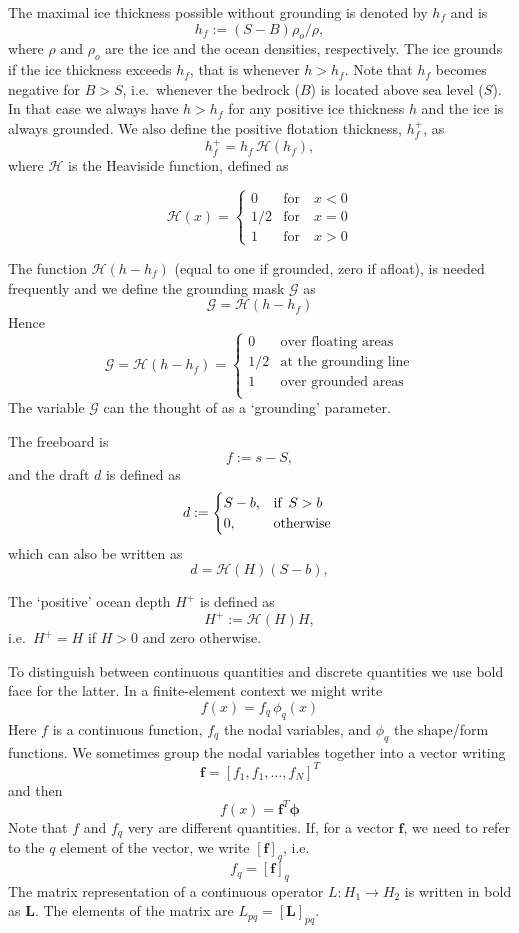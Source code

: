 \documentclass[10pt,a4paper]{book}
\newcommand{\He}{\mathcal{H}}
\newcommand{\G}{\mathcal{G}}
\begin{document}
The maximal ice thickness possible without grounding is denoted by $h_f$ and is
\[
h_f :=(S-B) \rho_o/\rho ,
\]
where $\rho$ and $\rho_o$ are the ice and the ocean densities,
respectively. The ice grounds if the ice thickness exceeds $h_f$, that
is whenever $h>h_f$.  Note that $h_f$ becomes negative for $B>S$,
i.e.\ whenever the bedrock ($B$) is located above sea level ($S$). In
that case we always have $h>h_f$ for any positive ice thickness $h$
and the ice is always grounded. We also define the positive flotation
thickness, $h_f^+$, as
\[
h_f^+ = h_f \, \He(h_f) ,
\]
where $\He$ is the Heaviside function, defined as

\[ \He(x)=  \begin{cases} 
              0 & \text{for}   \quad x < 0 \\          
             1/2 & \text{for}  \quad x=0 \\
             1 & \text{for}    \quad x>0
   \end{cases}
\]


The function $\He(h-h_f)$ (equal to one if grounded, zero if afloat),
is needed frequently and we define the grounding mask $\G$ as
\[
\G=\He(h-h_f)
\]
Hence
\begin{equation} \G =  \He(h-h_f) = \begin{cases} 
              0 & \text{over floating areas}    \\          
             1/2 & \text{at the grounding line}\\
             1 & \text{over grounded areas}   \\
   \end{cases}
\label{eq:Gdef}
\end{equation}
The variable $\G$ can the thought of as a `grounding' parameter.



The freeboard is
\[
f:=s-S,
\]
and the draft $d$ is defined as
\[
d:=\begin{cases} S-b , & \mbox{if } \, S>b \\  0 , & \hbox{otherwise }  \end{cases}
\]
which can also be written as
\[
d=\He(H) (S-b) ,
\]

The `positive' ocean depth $H^{+}$ is defined as
\begin{equation}
H^{+} := \He(H) H ,
\label{eq:Hplus}
\end{equation}
i.e.\ $H^{+}=H$ if $H>0$ and zero otherwise.




To distinguish between continuous quantities and discrete quantities we
use bold face for the latter.  In a finite-element context we might
write
\[ 
f(x) = f_q \, \phi_q(x) 
\]
Here $f$ is a continuous function, $f_q$ the nodal variables, and
$\phi_q$ the shape/form functions. We sometimes group the nodal
variables together into a vector writing
\[
\bm{f}=[f_1, f_1, \dots , f_N]^T
\]
and then
\[
f(x) = \bm{f}^T \bm{\phi}
\]
Note that $f$ and $f_q$ very are different quantities. If, for a vector
$\bm{f}$, we need to refer to the $q$ element of the vector, we write
$[\bm{f}]_q$, i.e.
\[
f_q=[\bm{f}]_q
\] 
The matrix representation of a continuous operator $L: H_1 \to H_2$ is
written in bold as $\bm{L}$. The elements of the matrix are
$L_{pq}=[\bm{L}]_{pq}$.
\end{document}
